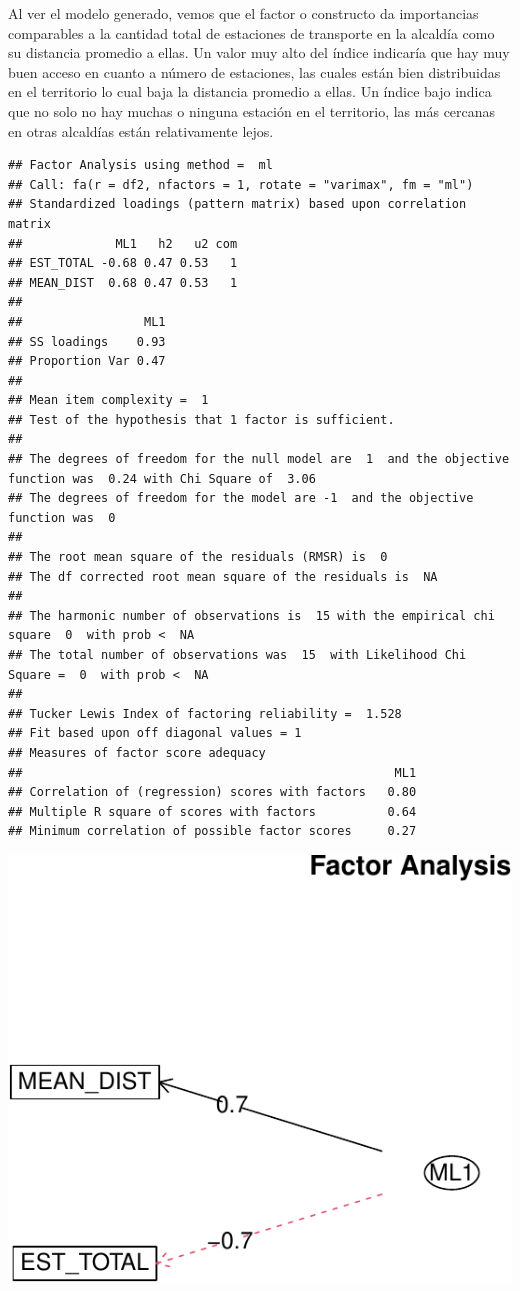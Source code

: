 \documentclass[
  spanish,
]{article}
\begin{document}
Al ver el modelo generado, vemos que el factor o constructo da
importancias comparables a la cantidad total de estaciones de transporte
en la alcaldía como su distancia promedio a ellas. Un valor muy alto del
índice indicaría que hay muy buen acceso en cuanto a número de
estaciones, las cuales están bien distribuidas en el territorio lo cual
baja la distancia promedio a ellas. Un índice bajo indica que no solo no
hay muchas o ninguna estación en el territorio, las más cercanas en
otras alcaldías están relativamente lejos.

\begin{verbatim}
## Factor Analysis using method =  ml
## Call: fa(r = df2, nfactors = 1, rotate = "varimax", fm = "ml")
## Standardized loadings (pattern matrix) based upon correlation matrix
##             ML1   h2   u2 com
## EST_TOTAL -0.68 0.47 0.53   1
## MEAN_DIST  0.68 0.47 0.53   1
## 
##                 ML1
## SS loadings    0.93
## Proportion Var 0.47
## 
## Mean item complexity =  1
## Test of the hypothesis that 1 factor is sufficient.
## 
## The degrees of freedom for the null model are  1  and the objective function was  0.24 with Chi Square of  3.06
## The degrees of freedom for the model are -1  and the objective function was  0 
## 
## The root mean square of the residuals (RMSR) is  0 
## The df corrected root mean square of the residuals is  NA 
## 
## The harmonic number of observations is  15 with the empirical chi square  0  with prob <  NA 
## The total number of observations was  15  with Likelihood Chi Square =  0  with prob <  NA 
## 
## Tucker Lewis Index of factoring reliability =  1.528
## Fit based upon off diagonal values = 1
## Measures of factor score adequacy             
##                                                    ML1
## Correlation of (regression) scores with factors   0.80
## Multiple R square of scores with factors          0.64
## Minimum correlation of possible factor scores     0.27
\end{verbatim}

\begin{center}\includegraphics{proyecto_files/figure-latex/unnamed-chunk-21-1} \end{center}
\end{document}

